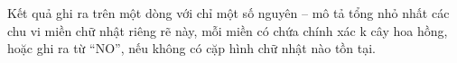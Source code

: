 Kết quả ghi ra trên một dòng với chỉ một số nguyên – mô tả tổng nhỏ nhất các chu vi miền chữ nhật riêng rẽ này, mỗi miền có chứa chính xác k cây hoa hồng, hoặc ghi ra từ “NO”, nếu không có cặp hình chữ nhật nào tồn tại.